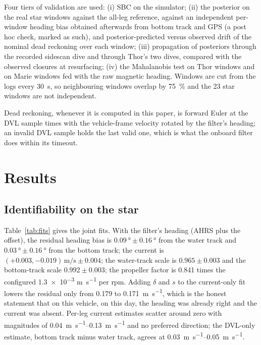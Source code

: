\documentclass[conference]{IEEEtran}
\begin{document}
Four tiers of validation are used: (i) SBC on the simulator; (ii) the posterior on the real star windows against the all-leg reference, against an independent per-window heading bias obtained afterwards from bottom track and GPS (a post hoc check, marked as such), and posterior-predicted versus observed drift of the nominal dead reckoning over each window; (iii) propagation of posteriors through the recorded sidescan dive and through Thor's two dives, compared with the observed closures at resurfacing; (iv) the Mahalanobis test on Thor windows and on Marie windows fed with the raw magnetic heading. Windows are cut from the logs every \SI{30}{\second}, so neighbouring windows overlap by \SI{75}{\percent} and the 23 star windows are not independent.

Dead reckoning, whenever it is computed in this paper, is forward Euler at the DVL sample times with the vehicle-frame velocity rotated by the filter's heading; an invalid DVL sample holds the last valid one, which is what the onboard filter does within its timeout.

\section{Results}

\subsection{Identifiability on the star}

Table~\ref{tab:fits} gives the joint fits. With the filter's heading (AHRS plus the offset), the residual heading bias is $\SI{0.09}{\degree} \pm \SI{0.16}{\degree}$ from the water track and $\SI{0.03}{\degree} \pm \SI{0.16}{\degree}$ from the bottom track; the current is $(+0.003, -0.019)\,\si{\meter\per\second} \pm 0.004$; the water-track scale is $0.965 \pm 0.003$ and the bottom-track scale $0.992 \pm 0.003$; the propeller factor is 0.841 times the configured \num{1.3e-3} \si{\meter\per\second} per rpm. Adding $\delta$ and $s$ to the current-only fit lowers the residual only from 0.179 to \SI{0.171}{\meter\per\second}, which is the honest statement that on this vehicle, on this day, the heading was already right and the current was absent. Per-leg current estimates scatter around zero with magnitudes of \SIrange{0.04}{0.13}{\meter\per\second} and no preferred direction; the DVL-only estimate, bottom track minus water track, agrees at \SIrange{0.03}{0.05}{\meter\per\second}.
\end{document}
